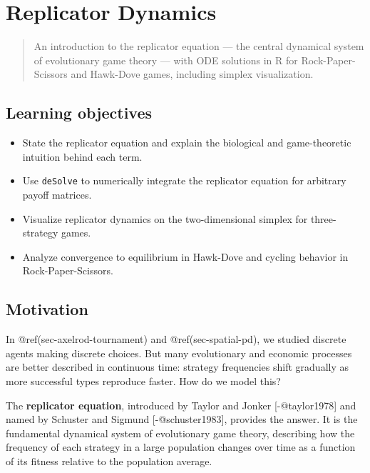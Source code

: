 \documentclass[
]{article}
\author{}
\date{\vspace{-2.5em}}
\providecommand{\tightlist}{%
  \setlength{\itemsep}{0pt}\setlength{\parskip}{0pt}}
\begin{document}
\section{Replicator Dynamics}\label{sec-replicator-dynamics}

\begin{quote}
An introduction to the replicator equation --- the central dynamical
system of evolutionary game theory --- with ODE solutions in R for
Rock-Paper-Scissors and Hawk-Dove games, including simplex
visualization.
\end{quote}

\subsection*{Learning objectives}\label{learning-objectives}

\begin{itemize}
\tightlist
\item
  State the replicator equation and explain the biological and
  game-theoretic intuition behind each term.
\item
  Use \texttt{deSolve} to numerically integrate the replicator equation
  for arbitrary payoff matrices.
\item
  Visualize replicator dynamics on the two-dimensional simplex for
  three-strategy games.
\item
  Analyze convergence to equilibrium in Hawk-Dove and cycling behavior
  in Rock-Paper-Scissors.
\end{itemize}

\subsection{Motivation}\label{motivation}

In @ref(sec-axelrod-tournament) and @ref(sec-spatial-pd), we studied
discrete agents making discrete choices. But many evolutionary and
economic processes are better described in continuous time: strategy
frequencies shift gradually as more successful types reproduce faster.
How do we model this?

The \textbf{replicator equation}, introduced by Taylor and Jonker
{[}-@taylor1978{]} and named by Schuster and Sigmund
{[}-@schuster1983{]}, provides the answer. It is the fundamental
dynamical system of evolutionary game theory, describing how the
frequency of each strategy in a large population changes over time as a
function of its fitness relative to the population average.
\end{document}
